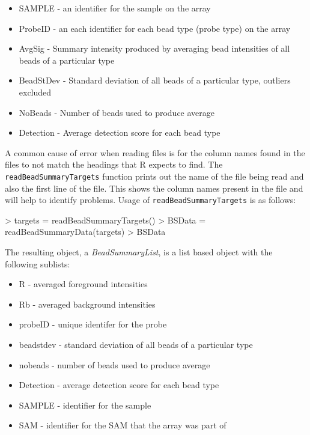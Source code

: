 \documentclass[a4paper]{article}
\newcommand{\Rfunction}[1]{{\texttt{#1}}}
\newcommand{\Rclass}[1]{{\textit{#1}}}
\begin{document}
\begin{itemize}
\item{SAMPLE - an identifier for the sample on the array}
\item{ProbeID - an each identifier for each bead type (probe type) on the array}
\item{AvgSig - Summary intensity produced by averaging bead intensities of all beads of a particular type}
\item{BeadStDev - Standard deviation of all beads of a particular type, outliers excluded}
\item{NoBeads - Number of beads used to produce average}
\item{Detection - Average detection score for each bead type}
\end{itemize}

A common cause of error when reading files is for the column names found in the files to not match the headings that {\sf R} expects to find. The \Rfunction{readBeadSummaryTargets} function prints out the name of the file being read and also the first line of the file. 
This shows the column names present in the file and will help to identify problems. Usage of \Rfunction{readBeadSummaryTargets} is as follows:

\begin{Schunk}
\begin{Sinput}
> targets = readBeadSummaryTargets()
> BSData = readBeadSummaryData(targets)
> BSData
\end{Sinput}
\end{Schunk}


The resulting object, a \Rclass{BeadSummaryList}, is a list based object with the following sublists: 

\begin{itemize}
\item{R - averaged foreground intensities}
\item{Rb - averaged background intensities}
\item{probeID - unique identifer for the probe}
\item{beadstdev - standard deviation of all beads of a particular type}
\item{nobeads - number of beads used to produce average}
\item{Detection - average detection score for each bead type}
\item{SAMPLE - identifier for the sample}
\item{SAM - identifier for the SAM that the array was part of}
\end{itemize}
\end{document}
